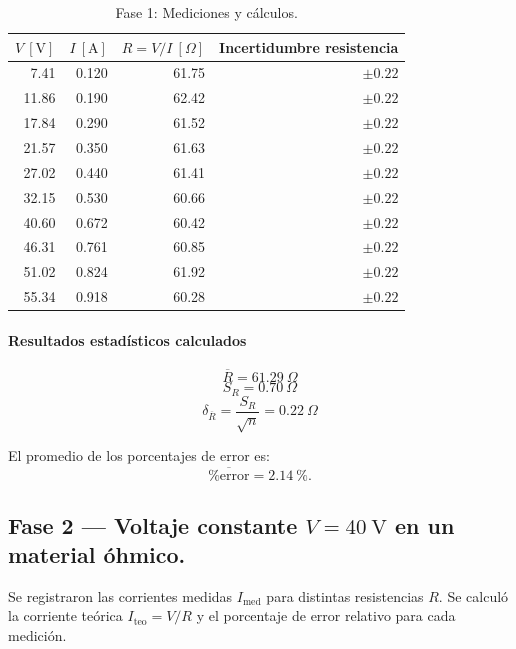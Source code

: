\documentclass[11pt,twocolumn]{article}
\begin{document}
\begin{table}[h]
\centering
\caption{Fase 1: Mediciones y cálculos.}
\label{tab:fase1}


\begin{tabular}{r r r r}
\hline
$V\ [\mathrm{V}]$ & $I\ [\mathrm{A}]$ & $R=V/I\ [\Omega]$ & Incertidumbre resistencia \\
\hline
7.41   & 0.120 & 61.75  & $\pm 0.22$ \\
11.86  & 0.190 & 62.42  & $\pm 0.22$ \\
17.84  & 0.290 & 61.52  & $\pm 0.22$ \\
21.57  & 0.350 & 61.63  & $\pm 0.22$ \\
27.02  & 0.440 & 61.41  & $\pm 0.22$ \\
32.15  & 0.530 & 60.66  & $\pm 0.22$ \\
40.60  & 0.672 & 60.42  & $\pm 0.22$ \\
46.31  & 0.761 & 60.85  & $\pm 0.22$ \\
51.02  & 0.824 & 61.92  & $\pm 0.22$ \\
55.34  & 0.918 & 60.28  & $\pm 0.22$ \\
\hline
\end{tabular}
\end{table}

\paragraph{Resultados estadísticos calculados}
\[
\overline{R} = 61.29\ \Omega
\]
\[
S_R = 0.70\ \Omega 
\]
\[
\delta_{\overline{R}} = \frac{S_R}{\sqrt{n}} = 0.22\ \Omega
\]

El promedio de los porcentajes de error es:
\[
\overline{\%\mathrm{error}} = 2.14\ \%.
\]

\subsection*{Fase 2 — Voltaje constante $V=40\ \mathrm{V}$ en un material óhmico.}

Se registraron las corrientes medidas \(I_{\mathrm{med}}\) para distintas resistencias \(R\). Se calculó la corriente teórica \(I_{\mathrm{teo}}=V/R\) y el porcentaje de error relativo para cada medición.
\end{document}
